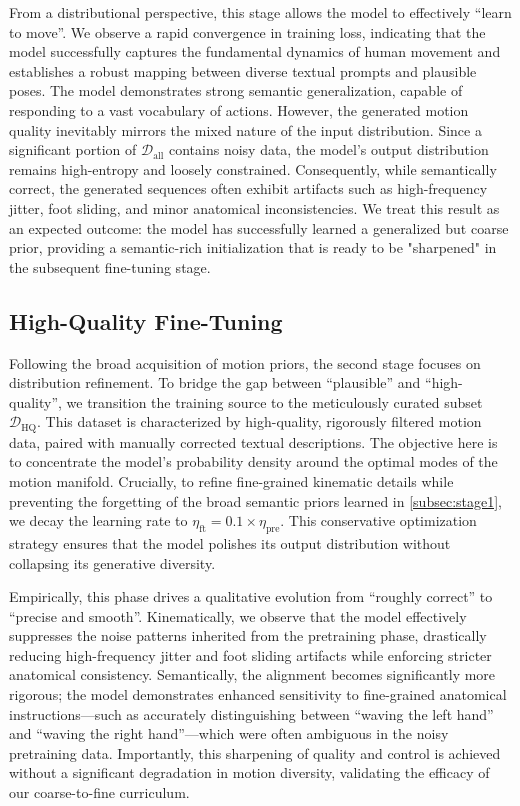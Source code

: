 From a distributional perspective, this stage allows the model to effectively ``learn to move''.
We observe a rapid convergence in training loss, indicating that the model successfully captures the fundamental dynamics of human movement and establishes a robust mapping between diverse textual prompts and plausible poses.
The model demonstrates strong semantic generalization, capable of responding to a vast vocabulary of actions.
However, the generated motion quality inevitably mirrors the mixed nature of the input distribution.
Since a significant portion of $\mathcal{D}_{\text{all}}$ contains noisy data, the model's output distribution remains high-entropy and loosely constrained.
Consequently, while semantically correct, the generated sequences often exhibit artifacts such as high-frequency jitter, foot sliding, and minor anatomical inconsistencies.
We treat this result as an expected outcome: the model has successfully learned a generalized but coarse prior, providing a semantic-rich initialization that is ready to be "sharpened" in the subsequent fine-tuning stage.

\subsection{High-Quality Fine-Tuning}
\label{subsec:stage2}

Following the broad acquisition of motion priors, the second stage focuses on distribution refinement.
To bridge the gap between ``plausible'' and ``high-quality'', we transition the training source to the meticulously curated subset $\mathcal{D}_{\text{HQ}}$.
This dataset is characterized by high-quality, rigorously filtered motion data, paired with manually corrected textual descriptions.
The objective here is to concentrate the model's probability density around the optimal modes of the motion manifold.
Crucially, to refine fine-grained kinematic details while preventing the forgetting of the broad semantic priors learned in \cref{subsec:stage1}, we decay the learning rate to $\eta_{\text{ft}} = 0.1 \times \eta_{\text{pre}}$. 
This conservative optimization strategy ensures that the model polishes its output distribution without collapsing its generative diversity.

Empirically, this phase drives a qualitative evolution from ``roughly correct'' to ``precise and smooth''.
Kinematically, we observe that the model effectively suppresses the noise patterns inherited from the pretraining phase, drastically reducing high-frequency jitter and foot sliding artifacts while enforcing stricter anatomical consistency.
Semantically, the alignment becomes significantly more rigorous; the model demonstrates enhanced sensitivity to fine-grained anatomical instructions—such as accurately distinguishing between ``waving the left hand'' and ``waving the right hand''—which were often ambiguous in the noisy pretraining data.
Importantly, this sharpening of quality and control is achieved without a significant degradation in motion diversity, validating the efficacy of our coarse-to-fine curriculum.


